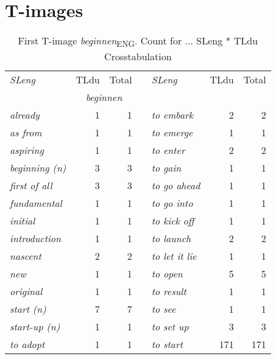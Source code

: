 \appendix
\chapter{T-images}\label{ch:A} 

\begin{table}
\caption{First T-image \textit{beginnen}\textsubscript{ENG}. Count for ... SLeng * TLdu Crosstabulation}
\begin{tabularx}{\textwidth}{>{\itshape}lrrX>{\itshape}lrr}
\lsptoprule
\normalfont SLeng & TLdu & Total          &   & \normalfont  SLeng &  TLdu & Total\\\cmidrule(lr){2-3}\cmidrule(lr){6-7}
& \multicolumn{2}{c}{\itshape beginnen}  & & & \multicolumn{2}{c}{\itshape beginnen}  \\\midrule
 already &  1 &  1 & & to embark &  2 &  2\\
 as from &  1 &  1                           & & to emerge &  1 &  1\\
 aspiring &  1 &  1                          & & to enter &  2 &  2\\
 beginning (n) &  3 &  3                     & & to gain &  1 &  1\\
 first of all &  3 &  3                      & & to go ahead &  1 &  1\\
 fundamental &  1 &  1                       & & to go into &  1 &  1\\
 initial &  1 &  1                           & & to kick off &  1 &  1\\
 introduction &  1 &  1                      & & to launch &  2 &  2\\
 nascent &  2 &  2                           & & to let it lie &  1 &  1\\
 new &  1 &  1                               & & to open &  5 &  5\\
 original &  1 &  1                          & & to result &  1 &  1\\
 start (n) &  7 &  7                         & & to see &  1 &  1\\
 start-up (n) &  1 &  1                      & & to set up &  3 &  3\\
 to adopt &  1 &  1                          & & to start &  171 &  171\\

\end{tabularx}
\end{table}
